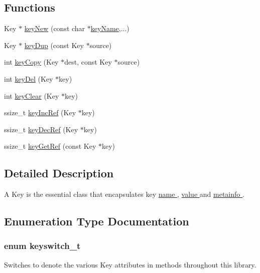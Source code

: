 \subsection*{Functions}
\begin{DoxyCompactItemize}
\item 
Key $\ast$ \hyperlink{group__key_gaf6893c038b3ebee90c73a9ea8356bebf}{key\-New} (const char $\ast$\hyperlink{group__keyname_ga8e805c726a60da921d3736cda7813513}{key\-Name},...)
\item 
Key $\ast$ \hyperlink{group__key_gae6ec6a60cc4b8c1463fa08623d056ce3}{key\-Dup} (const Key $\ast$source)
\item 
int \hyperlink{group__key_ga6a12cbbe656a1ad9f41b8c681d7a2f92}{key\-Copy} (Key $\ast$dest, const Key $\ast$source)
\item 
int \hyperlink{group__key_ga3df95bbc2494e3e6703ece5639be5bb1}{key\-Del} (Key $\ast$key)
\item 
int \hyperlink{group__key_gab2242311a36bbc0520e0d36895107ec1}{key\-Clear} (Key $\ast$key)
\item 
ssize\-\_\-t \hyperlink{group__key_ga6970a6f254d67af7e39f8e469bb162f1}{key\-Inc\-Ref} (Key $\ast$key)
\item 
ssize\-\_\-t \hyperlink{group__key_ga2c6433ca22109e4e141946057eccb283}{key\-Dec\-Ref} (Key $\ast$key)
\item 
ssize\-\_\-t \hyperlink{group__key_ga4aabc4272506dd63161db2bbb42de8ae}{key\-Get\-Ref} (const Key $\ast$key)
\end{DoxyCompactItemize}


\subsection{Detailed Description}
A Key is the essential class that encapsulates key \hyperlink{group__keyname}{name }, \hyperlink{group__keyvalue}{value } and \hyperlink{group__keymeta}{metainfo }. 

\subsection{Enumeration Type Documentation}
\hypertarget{group__key_ga91fb3178848bd682000958089abbaf40}{
\subsubsection[{keyswitch\-\_\-t}]{\setlength{\rightskip}{0pt plus 5cm}enum {\bf keyswitch\-\_\-t}}}\label{group__key_ga91fb3178848bd682000958089abbaf40}
Switches to denote the various Key attributes in methods throughout this library.

